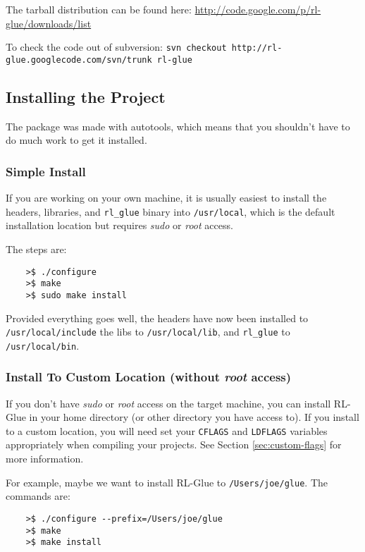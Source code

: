 \documentclass[11pt]{article}
\begin{document}
The tarball distribution can be found here:\newline
\url{http://code.google.com/p/rl-glue/downloads/list}


To check the code out of subversion:\newline
\texttt{svn checkout http://rl-glue.googlecode.com/svn/trunk rl-glue}

\subsection{Installing the Project}
The package was made with autotools, which means that you shouldn't have to do much work to get it installed.  

\subsubsection{Simple Install}
If you are working on your own machine, it is usually easiest to install the headers, libraries, and \texttt{rl\_glue} binary into \texttt{/usr/local}, which is the default 
installation location but requires \textit{sudo} or \textit{root} access.

The steps are:
\begin{verbatim}
	>$ ./configure
	>$ make
	>$ sudo make install
\end{verbatim}

Provided everything goes well, the headers have now been installed to \texttt{/usr/local/include} the libs to \texttt{/usr/local/lib}, and \texttt{rl\_glue} to \texttt{/usr/local/bin}.

\subsubsection{Install  To Custom Location (without \textit{root} access)}
If you don't have \textit{sudo} or \textit{root} access on the target machine, you can install RL-Glue in your home directory (or other directory you have access to).
If you install to a custom location, you will need set your \texttt{CFLAGS} and \texttt{LDFLAGS} variables appropriately when compiling your projects. See Section \ref{sec:custom-flags} for more information.

For example, maybe we want to install RL-Glue to \texttt{/Users/joe/glue}.  The commands are:
\begin{verbatim}
	>$ ./configure --prefix=/Users/joe/glue
	>$ make
	>$ make install
\end{verbatim}
\end{document}
